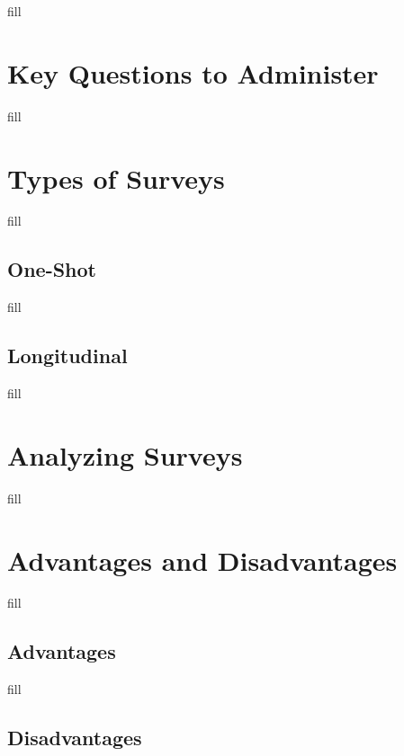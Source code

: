 \documentclass[
  b5paper]{book}
\begin{document}
fill

\hypertarget{key-questions-to-administer}{%
\section{Key Questions to Administer}\label{key-questions-to-administer}}

fill

\hypertarget{types-of-surveys}{%
\section{Types of Surveys}\label{types-of-surveys}}

fill

\hypertarget{one-shot}{%
\subsection*{One-Shot}\label{one-shot}}

fill

\hypertarget{longitudinal}{%
\subsection*{Longitudinal}\label{longitudinal}}

fill

\hypertarget{analyzing-surveys}{%
\section{Analyzing Surveys}\label{analyzing-surveys}}

fill

\hypertarget{advantages-and-disadvantages}{%
\section{Advantages and Disadvantages}\label{advantages-and-disadvantages}}

fill

\hypertarget{advantages}{%
\subsection*{Advantages}\label{advantages}}

fill

\hypertarget{disadvantages}{%
\subsection*{Disadvantages}\label{disadvantages}}
\end{document}
